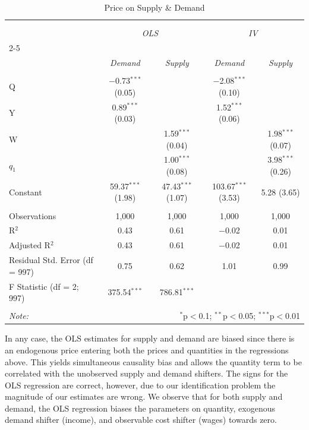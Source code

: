 \documentclass[12pt]{article}
\begin{document}
\begin{table}[!htbp] \centering 
  \caption{Price on Supply \& Demand} 
  \label{} 
\small 
\begin{tabular}{@{\extracolsep{5pt}}lcccc} 
\\[-1.8ex]\hline 
\hline \\[-1.8ex] 
\\[-1.8ex] 
& \multicolumn{2}{c}{\textit{OLS}} 
& \multicolumn{2}{c}{\textit{IV}} \\ 
\cline{2-5} \\[-1ex]
& \textit{Demand} & \textit{Supply} 
& \textit{Demand} & \textit{Supply} \\ 
\hline \\[-1.8ex]
 Q & $-$0.73$^{***}$ (0.05) &  & $-$2.08$^{***}$ (0.10) &  \\ 
  Y & 0.89$^{***}$ (0.03) &  & 1.52$^{***}$ (0.06) &  \\ 
  W &  & 1.59$^{***}$ (0.04) &  & 1.98$^{***}$ (0.07) \\ 
  $q_1$ &  & 1.00$^{***}$ (0.08) &  & 3.98$^{***}$ (0.26) \\ 
  Constant & 59.37$^{***}$ (1.98) & 47.43$^{***}$ (1.07) & 103.67$^{***}$ (3.53) & 5.28 (3.65) \\ 
 \hline \\[-1.8ex] 
Observations & 1,000 & 1,000 & 1,000 & 1,000 \\ 
R$^{2}$ & 0.43 & 0.61 & $-$0.02 & 0.01 \\ 
Adjusted R$^{2}$ & 0.43 & 0.61 & $-$0.02 & 0.01 \\ 
Residual Std. Error (df = 997) & 0.75 & 0.62 & 1.01 & 0.99 \\ 
F Statistic (df = 2; 997) & 375.54$^{***}$ & 786.81$^{***}$ &  &  \\ 
\hline 
\hline \\[-1.8ex] 
\textit{Note:}  & \multicolumn{4}{r}{$^{*}$p$<$0.1; $^{**}$p$<$0.05; $^{***}$p$<$0.01} \\ 
\end{tabular} 
\end{table} 
In any case, the OLS estimates for supply and demand are biased since there is an endogenous price entering both the prices and quantities in the regressions above. This yields simultaneous causality bias and allows the quantity term to be correlated with the unobserved supply and demand shifters. The signs for the OLS regression are correct, however, due to our identification problem the magnitude of our estimates are wrong. We observe that for both supply and demand, the OLS regression biases the parameters on quantity, exogenous demand shifter (income), and observable cost shifter (wages) towards zero.
\end{document}

